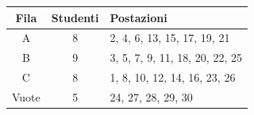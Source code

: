 \documentclass[a4paper,11pt]{article}
\begin{document}
\vspace{4pt}
\begin{center}\small
\renewcommand{\arraystretch}{1.3}
\begin{tabular}{|c|c|l|}\hline
\textbf{Fila} & \textbf{Studenti} & \textbf{Postazioni}\\\hline
A & 8 & 2, 4, 6, 13, 15, 17, 19, 21\\\hline
B & 9 & 3, 5, 7, 9, 11, 18, 20, 22, 25\\\hline
C & 8 & 1, 8, 10, 12, 14, 16, 23, 26\\\hline
Vuote & 5 & 24, 27, 28, 29, 30\\\hline
\end{tabular}
\end{center}
\end{document}
